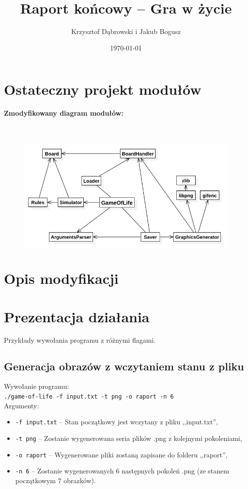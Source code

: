 \documentclass{mwart}
\title{Raport końcowy -- Gra w życie}
\author{Krzysztof Dąbrowski i Jakub Bogusz}
\date{\today}
\begin{document}
\maketitle{}

\tableofcontents{}

\section{Ostateczny projekt modułów}
\paragraph{Zmodyfikowany diagram modułów:}\mbox{}\\
\begin{figure}[H]
	\centering
	\def\svgwidth{\columnwidth}
	\includegraphics[width=13cm]{diagram_modulow.png}
\end{figure}



\section{Opis modyfikacji}

\section{Prezentacja działania}
Przykłady wywołania programu z różnymi flagami.

\subsection{Generacja obrazów z wczytaniem stanu z pliku}
\noindent{}Wywołanie programu: \\
\texttt{./game-of-life -f input.txt -t png -o raport -n 6} \\
Argumenty:
\begin{itemize}
\item \texttt{-f input.txt} -- Stan początkowy jest wczytany z pliku ,,input.txt'',
\item \texttt{-t png} -- Zostanie wygenerowana seria plików .png z kolejnymi pokoleniami,
\item \texttt{-o raport} -- Wygenerowane pliki zostaną zapisane do folderu ,,raport'',
\item \texttt{-n 6} -- Zostanie wygenerowanych 6 następnych pokoleń .png (ze stanem początkowym 7 obrazków).
\end{itemize}
\end{document}
